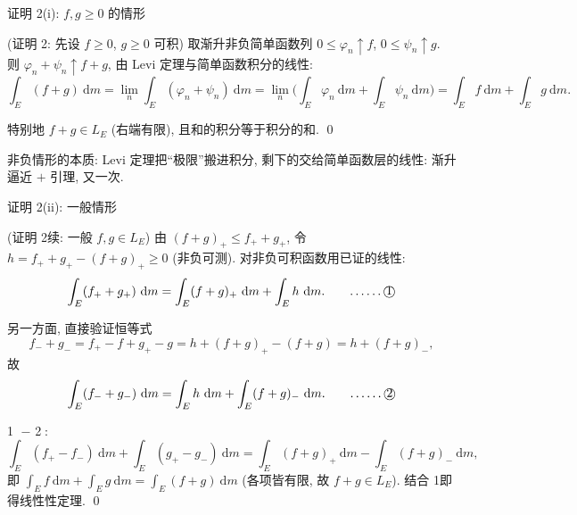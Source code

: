 
\begin{frame}{证明 2\textdegree (i): $f, g \geqslant 0$ 的情形}

\startproof[bg=yellow, fg=red](证明 2\textdegree: 先设 $f \geqslant 0$, $g \geqslant 0$ 可积)
取渐升非负简单函数列 $0 \leqslant \varphi_n \uparrow f$, $0 \leqslant \psi_n \uparrow g$.
则 $\varphi_n + \psi_n \uparrow f + g$, 由 Levi 定理与简单函数积分的线性:
\[
\int_E (f + g) ~ \mathrm{d} m
= \lim_n \int_E (\varphi_n + \psi_n) ~ \mathrm{d} m
= \lim_n \Big( \int_E \varphi_n ~ \mathrm{d} m + \int_E \psi_n ~ \mathrm{d} m \Big)
= \int_E f ~ \mathrm{d} m + \int_E g ~ \mathrm{d} m .
\]

\pause

特别地 $f + g \in L_E$ (右端有限), 且和的积分等于积分的和. \qed

\pause

\begin{attnblock}
非负情形的本质: \alert{Levi 定理把``极限''搬进积分}, 剩下的交给简单函数层的线性:
渐升逼近 $+$ 引理, 又一次.
\end{attnblock}

\end{frame}


\begin{frame}{证明 2\textdegree (ii): 一般情形}

\startproof[bg=yellow, fg=red](证明 2\textdegree 续: 一般 $f, g \in L_E$)
由 $(f+g)_+ \leqslant f_+ + g_+$, 令 $h = f_+ + g_+ - (f+g)_+ \geqslant 0$ (非负可测).
对非负可积函数用已证的线性:
\[
\int_E (f_+ + g_+) ~ \mathrm{d} m = \int_E (f+g)_+ ~ \mathrm{d} m + \int_E h ~ \mathrm{d} m .
\qquad \text{……\textcircled{1}}
\]

\pause

另一方面, 直接验证恒等式
\[
f_- + g_- = f_+ - f + g_+ - g = h + (f+g)_+ - (f+g) = h + (f+g)_- ,
\]
故
\[
\int_E (f_- + g_-) ~ \mathrm{d} m = \int_E h ~ \mathrm{d} m + \int_E (f+g)_- ~ \mathrm{d} m .
\qquad \text{……\textcircled{2}}
\]

\pause

\textcircled{1} $-$ \textcircled{2}:
\[
\int_E (f_+ - f_-) ~ \mathrm{d} m + \int_E (g_+ - g_-) ~ \mathrm{d} m
= \int_E (f+g)_+ ~ \mathrm{d} m - \int_E (f+g)_- ~ \mathrm{d} m ,
\]
即 $\int_E f ~ \mathrm{d} m + \int_E g ~ \mathrm{d} m = \int_E (f+g) ~ \mathrm{d} m$ (各项皆有限,
故 $f + g \in L_E$). 结合 1\textdegree 即得线性性定理. \qed

\end{frame}

